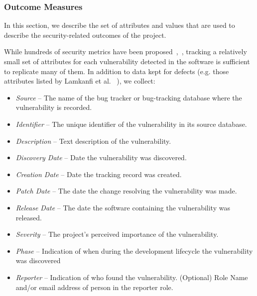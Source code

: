 \subsubsection{Outcome Measures}
In this section, we describe the set of attributes and values that are used to describe the security-related outcomes of the project. 

While hundreds of security metrics have been proposed~\cite{rudolph2012critical},~\cite{verendel2009quantified}, tracking a relatively small set of attributes for each vulnerability detected in the software is sufficient to replicate many of them. In addition to data kept for defects (e.g. those attributes listed by Lamkanfi et al.  ~\cite{lamkanfi2013eclipse}), we collect:
\begin{itemize}
\item \textit{Source} – The name of the bug tracker or bug-tracking database where the vulnerability is recorded.
\item \textit{Identifier} – The unique identifier of the vulnerability in its source database.
\item \textit{Description} – Text description of the vulnerability.
\item \textit{Discovery Date} – Date the vulnerability was discovered. 
\item \textit{Creation Date} – Date the tracking record was created.
\item \textit{Patch Date} – The date the change resolving the vulnerability was made.
\item \textit{Release Date} – The date the software containing the vulnerability was released.
\item \textit{Severity} – The project's perceived importance of the vulnerability. 
\item \textit{Phase}  – Indication of when during the development lifecycle the vulnerability was discovered
\item \textit{Reporter} – Indication of who found the vulnerability. (Optional) Role Name and/or email address of person in the reporter role. 
\end{itemize}

